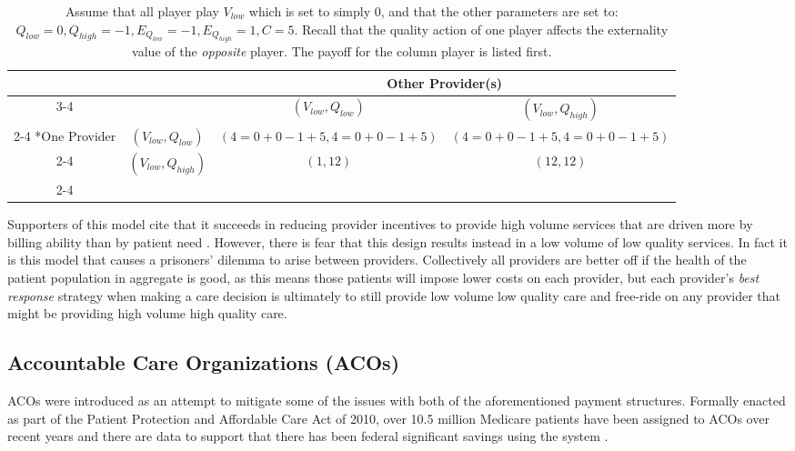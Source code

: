\documentclass{article}
\begin{document}
\begin{table}[H]
\centering
  \setlength{\extrarowheight}{2pt}
  \begin{tabular}{*{4}{c|}}
    \multicolumn{2}{c}{} & \multicolumn{2}{c}{Other Provider(s)}\\\cline{3-4}
    \multicolumn{1}{c}{} &  & $(V_{low}, Q_{low})$  & $(V_{low}, Q_{high})$ \\\cline{2-4}
      \multirow{2}*{One Provider}  & $(V_{low}, Q_{low})$ & $(4=0+0-1+5, 4=0+0-1+5)$ & $(4=0+0-1+5, 4=0+0-1+5)$ \\\cline{2-4}
    & $(V_{low}, Q_{high})$ & $(1,12)$ & $(12,12)$ \\\cline{2-4}
  \end{tabular}
\caption{Assume that all player play $V_{low}$ which is set to simply $0$, and that the other parameters are set to: $Q_{low} = 0, Q_{high} = -1, E_{Q_{low}} = -1, E_{Q_{high}} = 1, C = 5$. Recall that the quality action of one player affects the externality value of the \emph{opposite} player. The payoff for the column player is listed first.}
\label{table:cap}
\end{table}

Supporters of this model cite that it succeeds in reducing provider incentives to provide high volume services that are driven more by billing ability than by patient need \cite{blended}. However, there is fear that this design results instead in a low volume of low quality services. In fact it is this model that causes a prisoners' dilemma to arise between providers. Collectively all providers are better off if the health of the patient population in aggregate is good, as this means those patients will impose lower costs on each provider, but each provider's \emph{best response} strategy when making a care decision is ultimately to still provide low volume low quality care and free-ride on any provider that might be providing high volume high quality care.

\subsection{Accountable Care Organizations (ACOs)} \label{sec:aco}
ACOs were introduced as an attempt to mitigate some of the issues with both of the aforementioned payment structures. Formally enacted as part of the Patient Protection and Affordable Care Act of 2010, over 10.5 million Medicare patients have been assigned to ACOs over recent years and there are data to support that there has been federal significant savings using the system \cite{acos}.
\end{document}
